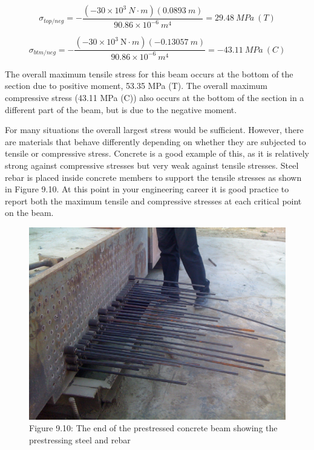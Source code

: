 \documentclass[
  letterpaper,
  DIV=11,
  numbers=noendperiod]{scrreprt}
\begin{document}
\begin{tcolorbox}
\begin{tcolorbox}
\[ \sigma_{top/neg}=-\frac{\left(-30 \times 10^3{~N}\cdot{m}\right)(0.0893{~m})}{90.86 \times 10^{-6}{~m}^4}=29.48{~MPa~(T)} \]

\[ \sigma_{btm/neg}=-\frac{\left(-30 \times 10^3 \mathrm{~N}\cdot{m}\right)(-0.13057{~m})}{90.86 \times 10^{-6}{~m}^4}=-43.11{~MPa}~{(C)} \]

The overall maximum tensile stress for this beam occurs at the bottom of
the section due to positive moment, 53.35 MPa (T). The overall maximum
compressive stress (43.11 MPa (C)) also occurs at the bottom of the
section in a different part of the beam, but is due to the negative
moment.

\end{tcolorbox}

\end{tcolorbox}

For many situations the overall largest stress would be sufficient.
However, there are materials that behave differently depending on
whether they are subjected to tensile or compressive stress. Concrete is
a good example of this, as it is relatively strong against compressive
stresses but very weak against tensile stresses. Steel rebar is placed
inside concrete members to support the tensile stresses as shown in
Figure 9.10. At this point in your engineering career it is good
practice to report both the maximum tensile and compressive stresses at
each critical point on the beam.

\begin{figure}[H]

{\centering \includegraphics[width=5.13542in,height=\textheight]{images/figure 9.10 (needs replacement).jpg}

}

\caption{Figure 9.10: The end of the prestressed concrete beam showing
the prestressing steel and rebar}

\end{figure}%
\end{document}

